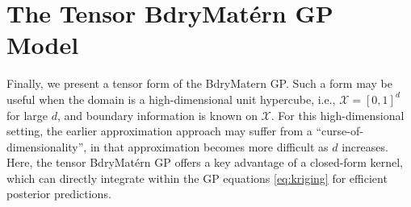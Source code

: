 \documentclass[aos,preprint]{imsart}
\theoremstyle{plain}
\newcommand{\cmtS}[1]{{\color{red}{(Simon: #1)}}}
\theoremstyle{remark}
\begin{document}
\section{The Tensor BdryMat\'ern GP Model}
\label{sec:tensor_mat}



Finally, we present a tensor form of the BdryMat\;ern GP. Such a form may be useful when the domain is a high-dimensional unit hypercube, i.e., $\mathcal{X} = [0,1]^d$ for large $d$, and boundary information is known on $\mathcal{X}$. For this high-dimensional setting, the earlier approximation approach may suffer from a ``curse-of-dimensionality'', in that approximation becomes more difficult as $d$ increases. Here, the tensor BdryMat\'ern GP offers a key advantage of a closed-form kernel, which can directly integrate within the GP equations \eqref{eq:kriging} for efficient posterior predictions.

\end{document}
